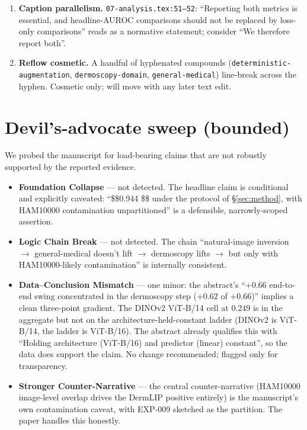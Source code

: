 \documentclass[11pt,a4paper]{article}
\begin{document}
\begin{enumerate}[leftmargin=2em]
      \texttt{tab1-cross-run.tex:19}: ``$+0.364$''. The seed-mean
      $\Delta$ is $0.9435 - 0.5802 = +0.3633 \to +0.363$; the
      single-seed $\Delta$ is $0.9447 - 0.5802 = +0.3645 \to +0.364$.
      The test cell uses seed-mean; the $\Delta$ should be computed on
      the same basis. Fix: $+0.364 \to +0.363$. (EXP-008 row already
      uses the seed-mean basis at $-0.252$.)
\item \textbf{Caption parallelism.} \texttt{07-analysis.tex:51--52}:
      ``Reporting both metrics is essential, and headline-AUROC
      comparisons should not be replaced by loss-only comparisons''
      reads as a normative statement; consider ``We therefore report
      both''.
\item \textbf{Reflow cosmetic.} A handful of hyphenated compounds
      (\texttt{deterministic-augmentation}, \texttt{dermoscopy-domain},
      \texttt{general-medical}) line-break across the hyphen. Cosmetic
      only; will move with any later text edit.
\end{enumerate}

\section{Devil's-advocate sweep (bounded)}

We probed the manuscript for load-bearing claims that are not robustly
supported by the reported evidence.

\begin{itemize}[leftmargin=2em]
\item \textbf{Foundation Collapse} --- not detected. The headline claim
      is conditional and explicitly caveated: ``\$\$0.944 \$\$
      under the protocol of \S\ref{sec:method}, with HAM10000
      contamination unpartitioned'' is a defensible, narrowly-scoped
      assertion.
\item \textbf{Logic Chain Break} --- not detected. The chain
      ``natural-image inversion $\to$ general-medical doesn't lift
      $\to$ dermoscopy lifts $\to$ but only with HAM10000-likely
      contamination'' is internally consistent.
\item \textbf{Data--Conclusion Mismatch} --- one minor: the abstract's
      ``$+0.66$ end-to-end swing concentrated in the dermoscopy step
      ($+0.62$ of $+0.66$)'' implies a clean three-point gradient. The
      DINOv2 ViT-B/14 cell at $0.249$ is in the aggregate but not on
      the architecture-held-constant ladder (DINOv2 is ViT-B/14, the
      ladder is ViT-B/16). The abstract already qualifies this with
      ``Holding architecture (ViT-B/16) and predictor (linear)
      constant'', so the data does support the claim. No change
      recommended; flagged only for transparency.
\item \textbf{Stronger Counter-Narrative} --- the central
      counter-narrative (HAM10000 image-level overlap drives the
      DermLIP positive entirely) is the manuscript's own contamination
      caveat, with EXP-009 sketched as the partition. The paper handles
      this honestly.
\end{itemize}
\end{document}
